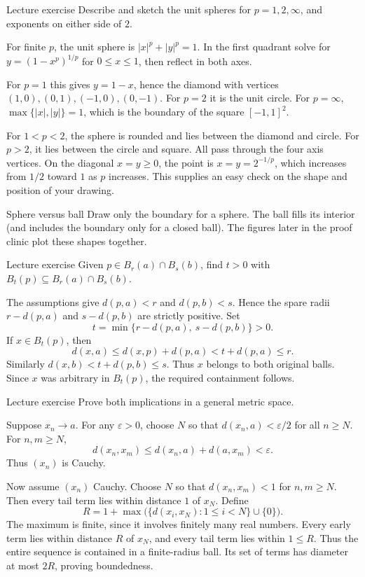 \begin{exam}{Lecture exercise}
Describe and sketch the unit spheres for $p=1,2,\infty$, and exponents on either side of $2$.
\end{exam}
\begin{answer}
For finite $p$, the unit sphere is $|x|^p+|y|^p=1$. In the first quadrant solve for $y=(1-x^p)^{1/p}$ for $0\le x\le1$, then reflect in both axes.

For $p=1$ this gives $y=1-x$, hence the diamond with vertices $(1,0),(0,1),(-1,0),(0,-1)$. For $p=2$ it is the unit circle. For $p=\infty$, $\max\{|x|,|y|\}=1$, which is the boundary of the square $[-1,1]^2$.

For $1<p<2$, the sphere is rounded and lies between the diamond and circle. For $p>2$, it lies between the circle and square. All pass through the four axis vertices. On the diagonal $x=y\ge0$, the point is $x=y=2^{-1/p}$, which increases from $1/2$ toward $1$ as $p$ increases. This supplies an easy check on the shape and position of your drawing.
\end{answer}
\begin{note}{Sphere versus ball}
Draw only the boundary for a sphere. The ball fills its interior (and includes the boundary only for a closed ball). The figures later in the proof clinic plot these shapes together.
\end{note}
\begin{exam}{Lecture exercise}
Given $p\in B_r(a)\cap B_s(b)$, find $t>0$ with $B_t(p)\subseteq B_r(a)\cap B_s(b)$.
\end{exam}
\begin{answer}
The assumptions give $d(p,a)<r$ and $d(p,b)<s$. Hence the spare radii $r-d(p,a)$ and $s-d(p,b)$ are strictly positive. Set
\[t=\min\{r-d(p,a),\ s-d(p,b)\}>0.\]
If $x\in B_t(p)$, then
\[d(x,a)\le d(x,p)+d(p,a)<t+d(p,a)\le r.\]
Similarly $d(x,b)<t+d(p,b)\le s$. Thus $x$ belongs to both original balls. Since $x$ was arbitrary in $B_t(p)$, the required containment follows.
\end{answer}
\begin{exam}{Lecture exercise}
Prove both implications in a general metric space.
\end{exam}
\begin{answer}
Suppose $x_n\to a$. For any $\varepsilon>0$, choose $N$ so that $d(x_n,a)<\varepsilon/2$ for all $n\ge N$. For $n,m\ge N$,
\[d(x_n,x_m)\le d(x_n,a)+d(a,x_m)<\varepsilon.\]
Thus $(x_n)$ is Cauchy.

Now assume $(x_n)$ Cauchy. Choose $N$ so that $d(x_n,x_m)<1$ for $n,m\ge N$. Then every tail term lies within distance $1$ of $x_N$. Define
\[R=1+\max\bigl(\{d(x_i,x_N):1\le i<N\}\cup\{0\}\bigr).\]
The maximum is finite, since it involves finitely many real numbers. Every early term lies within distance $R$ of $x_N$, and every tail term lies within $1\le R$. Thus the entire sequence is contained in a finite-radius ball. Its set of terms has diameter at most $2R$, proving boundedness.
\end{answer}
